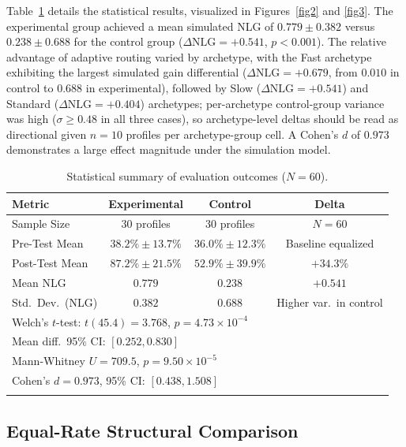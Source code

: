 \documentclass[pdflatex,sn-apa]{sn-jnl}
\begin{document}
Table~\ref{tab3} details the statistical results, visualized in Figures~\ref{fig2} and \ref{fig3}. The experimental group achieved a mean simulated NLG of $0.779 \pm 0.382$ versus $0.238 \pm 0.688$ for the control group ($\Delta\text{NLG}=+0.541$, $p<0.001$). The relative advantage of adaptive routing varied by archetype, with the Fast archetype exhibiting the largest simulated gain differential ($\Delta\text{NLG}=+0.679$, from $0.010$ in control to $0.688$ in experimental), followed by Slow ($\Delta\text{NLG}=+0.541$) and Standard ($\Delta\text{NLG}=+0.404$) archetypes; per-archetype control-group variance was high ($\sigma \geq 0.48$ in all three cases), so archetype-level deltas should be read as directional given $n=10$ profiles per archetype-group cell. A Cohen's $d$ of $0.973$ demonstrates a large effect magnitude under the simulation model.

\begin{table}[h]
\caption{Statistical summary of evaluation outcomes ($N=60$).}\label{tab3}
\begin{tabular}{@{}lccc@{}}
\toprule
Metric & Experimental & Control & Delta \\
\midrule
Sample Size & 30 profiles & 30 profiles & $N=60$ \\
Pre-Test Mean & $38.2\% \pm 13.7\%$ & $36.0\% \pm 12.3\%$ & Baseline equalized \\
Post-Test Mean & $87.2\% \pm 21.5\%$ & $52.9\% \pm 39.9\%$ & $+34.3\%$ \\
Mean NLG & $0.779$ & $0.238$ & $+0.541$ \\
Std.\ Dev.\ (NLG) & $0.382$ & $0.688$ & Higher var.\ in control \\
\midrule
\multicolumn{3}{l}{Welch's $t$-test: $t(45.4)=3.768$, $p=4.73\times10^{-4}$} & \\
\multicolumn{3}{l}{Mean diff.\ 95\% CI: $[0.252, 0.830]$} & \\
\multicolumn{3}{l}{Mann-Whitney $U=709.5$, $p=9.50\times10^{-5}$} & \\
\multicolumn{3}{l}{Cohen's $d=0.973$, 95\% CI: $[0.438, 1.508]$} & \\
\botrule
\end{tabular}
\end{table}

\subsection{Equal-Rate Structural Comparison}\label{sec5.4}
\end{document}
